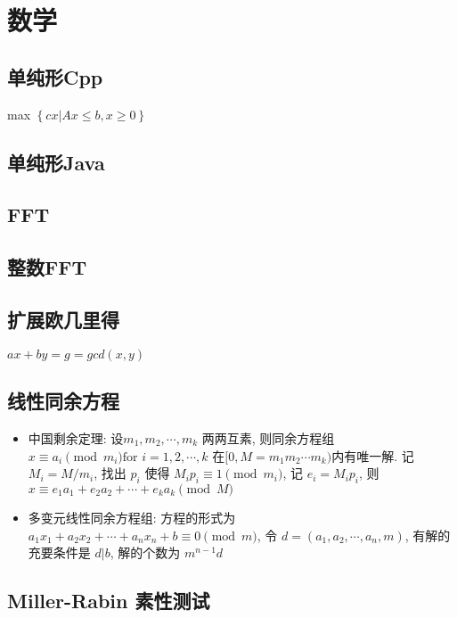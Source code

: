 \documentclass[landscape, twocolumn, 8pt, a4paper, twoside]{extarticle}
\begin{document}
\section{数学}
  \subsection{单纯形Cpp}
    max $\left \{ cx | Ax \le b, x \ge 0 \right \}$
    
  \subsection{单纯形Java}
    

  \subsection{FFT}
    

  \subsection{整数FFT}
    

  \subsection{扩展欧几里得}
    $ax + by = g = gcd(x, y)$
    

  \subsection{线性同余方程}
    \begin{itemize}
    \item 中国剩余定理:
      设$m_1, m_2, \cdots, m_k$ 两两互素, 则同余方程组 $x \equiv a_i \pmod{m_i} \textrm{for $i = 1, 2, \cdots, k$}$
      在$[0, M = m_1 m_2 \cdots m_k)$内有唯一解. 
      记 $M_i = M / m_i$,
      找出 $p_i$ 使得 $M_i p_i \equiv 1 \pmod{m_i}$,
      记 $e_i = M_i p_i$,
      则 $x \equiv e_1 a_1 + e_2 a_2 + \cdots + e_k a_k \pmod{M}$
    \item 多变元线性同余方程组:
      方程的形式为 $a_1 x_1 + a_2 x_2 + \cdots + a_n x_n + b \equiv 0 \pmod{m}$,
      令 $d = (a_1, a_2, \cdots, a_n, m)$,
      有解的充要条件是 $d | b$, 解的个数为 $m^{n - 1} d$
    \end{itemize}

  \subsection{Miller-Rabin 素性测试}
    
\end{document}
